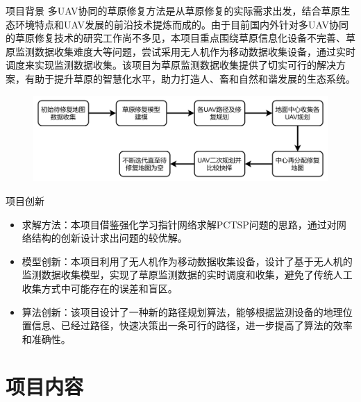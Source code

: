 \documentclass{beamer}
\begin{document}
\begin{frame}{项目背景}
    \quad \quad 多UAV协同的草原修复方法是从草原修复的实际需求出发，结合草原生态环境特点和UAV发展的前沿技术提炼而成的。由于目前国内外针对多UAV协同的草原修复技术的研究工作尚不多见，本项目重点围绕草原信息化设备不完善、草原监测数据收集难度大等问题，尝试采用无人机作为移动数据收集设备，通过实时调度来实现监测数据收集。该项目为草原监测数据收集提供了切实可行的解决方案，有助于提升草原的智慧化水平，助力打造人、畜和自然和谐发展的生态系统。\cite{8470897}\cite{9018112}

    \begin{figure}[htbp]
		  \centering
            \includegraphics[scale=0.1]{pic/0.png}
    \end{figure}
\end{frame}

\begin{frame}{项目创新}
    \begin{itemize}
        
        \item 求解方法：本项目借鉴强化学习指针网络求解PCTSP问题的思路，通过对网络结构的创新设计求出问题的较优解。
        \item 模型创新：本项目利用了无人机作为移动数据收集设备，设计了基于无人机的监测数据收集模型，实现了草原监测数据的实时调度和收集，避免了传统人工收集方式中可能存在的误差和盲区。
        \item 算法创新：该项目设计了一种新的路径规划算法，能够根据监测设备的地理位置信息、已经过路径，快速决策出一条可行的路径，进一步提高了算法的效率和准确性。
    \end{itemize}
\end{frame}

\section{项目内容}
\end{document}
